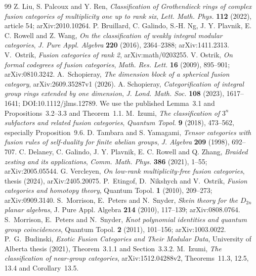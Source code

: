 \documentclass[11pt]{article}
\begin{document}
\begin{thebibliography}{99}
 Z. Liu, S. Palcoux and Y. Ren,
\emph{Classification of Grothendieck rings of complex fusion categories of multiplicity one up to rank six},
\emph{Lett. Math. Phys.} \textbf{112} (2022), article 54; arXiv:2010.10264.
 P. Bruillard, C. Galindo, S.-H. Ng, J. Y. Plavnik, E. C. Rowell and Z. Wang,
\emph{On the classification of weakly integral modular categories},
\emph{J. Pure Appl. Algebra} \textbf{220} (2016), 2364--2388; arXiv:1411.2313.
 V.~Ostrik, \emph{Fusion categories of rank 2},
arXiv:math/0203255.
 V. Ostrik,
\emph{On formal codegrees of fusion categories},
\emph{Math. Res. Lett.} \textbf{16} (2009), 895--901; arXiv:0810.3242.
 A.~Schopieray,
\emph{The dimension block of a spherical fusion category},
arXiv:2609.35287v1 (2026).
 A. Schopieray,
\emph{Categorification of integral group rings extended by one dimension},
\emph{J. Lond. Math. Soc.} \textbf{108} (2023), 1617--1641;
DOI:10.1112/jlms.12789. We use the published Lemma~3.1 and
Propositions~3.2--3.3 and Theorem~1.1.
 M.~Izumi,
\emph{The classification of $3^n$ subfactors and related fusion categories},
\emph{Quantum Topol.} \textbf{9} (2018), 473--562,
especially Proposition~9.6.
 D. Tambara and S. Yamagami,
\emph{Tensor categories with fusion rules of self-duality for finite abelian groups},
\emph{J. Algebra} \textbf{209} (1998), 692--707.
 C. Delaney, C. Galindo, J. Y. Plavnik, E. C. Rowell and Q. Zhang,
\emph{Braided zesting and its applications},
\emph{Comm. Math. Phys.} \textbf{386} (2021), 1--55; arXiv:2005.05544.
 G. Vercleyen,
\emph{On low-rank multiplicity-free fusion categories}, thesis (2024),
arXiv:2405.20075.
 P.~Etingof, D.~Nikshych and V.~Ostrik,
\emph{Fusion categories and homotopy theory}, Quantum Topol.
\textbf{1} (2010), 209--273; arXiv:0909.3140.
 S.~Morrison, E.~Peters and N.~Snyder,
\emph{Skein theory for the $D_{2n}$ planar algebras},
J. Pure Appl. Algebra \textbf{214} (2010), 117--139; arXiv:0808.0764.
 S.~Morrison, E.~Peters and N.~Snyder,
\emph{Knot polynomial identities and quantum group coincidences},
Quantum Topol. \textbf{2} (2011), 101--156; arXiv:1003.0022.
 P.~G.~Budinski,
\emph{Exotic Fusion Categories and Their Modular Data},
University of Alberta thesis (2021), Theorem~3.1.1 and Section~3.3.2.
 M.~Izumi,
\emph{The classification of near-group categories},
arXiv:1512.04288v2, Theorems~11.3, 12.5, 13.4 and Corollary~13.5.

\end{thebibliography}
\end{document}
